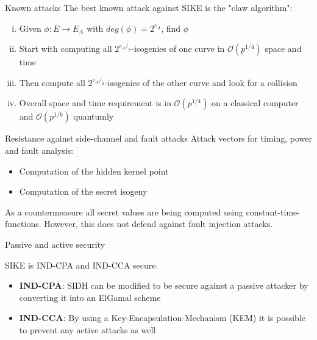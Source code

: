 \documentclass{beamer}
\begin{document}
\begin{frame}{Known attacks}
The best known attack against SIKE is the "claw algorithm":

\begin{enumerate}[(i)]
	\item Given $\phi : E \to E_A$ with $deg(\phi) = 2^{e_A}$, find $\phi$
	\item Start with computing all $2^{e_A/_2}$-isogenies of one curve in $\mathcal{O}(p^{1/4})$ space and time
	\item Then compute all $2^{e_A/_2}$-isogenies of the other curve and look for a collision
	\item Overall space and time requirement is in $\mathcal{O}(p^{1/4})$ on a classical computer and $\mathcal{O}(p^{1/6})$ quantumly
\end{enumerate}

\end{frame}

\begin{frame}{Resistance against side-channel and fault attacks}
Attack vectors for timing, power and fault analysis:
\begin{itemize}[\textbullet]
	\item Computation of the hidden kernel point
	\item Computation of the secret isogeny
\end{itemize}

\vfill

As a countermeasure all secret values are being computed using constant-time-functions. However, this does not defend against fault injection attacks.


\end{frame}

\begin{frame}{Passive and active security}

SIKE is IND-CPA and IND-CCA secure.

\begin{itemize}[\textbullet]
	\item \textbf{IND-CPA}: SIDH can be modified to be secure against a passive attacker by converting it into an ElGamal scheme
	\item \textbf{IND-CCA}: By using a Key-Encapsulation-Mechanism (KEM) it is possible to prevent any active attacks as well
\end{itemize}

\end{frame}
\end{document}
